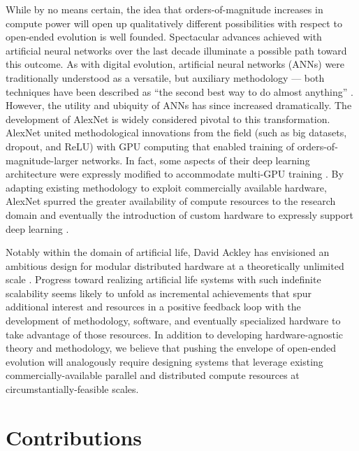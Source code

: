 While by no means certain, the idea that orders-of-magnitude increases in compute power will open up qualitatively different possibilities with respect to open-ended evolution is well founded.
Spectacular advances achieved with artificial neural networks over the last decade illuminate a possible path toward this outcome. As with digital evolution, artificial neural networks (ANNs) were traditionally understood as a versatile, but auxiliary methodology — both techniques have been described as ``the second best way to do almost anything'' \citep{miaoulis2008intelligent,eiben2015introduction}.
However, the utility and ubiquity of ANNs has since increased dramatically. The development of AlexNet is widely considered pivotal to this transformation. AlexNet united methodological innovations from the field (such as big datasets, dropout, and ReLU) with GPU computing that enabled training of orders-of-magnitude-larger networks.
In fact, some aspects of their deep learning architecture were expressly modified to accommodate multi-GPU training \citep{krizhevsky2012imagenet}.
By adapting existing methodology to exploit commercially available hardware, AlexNet spurred the greater availability of compute resources to the research domain and eventually the introduction of custom hardware to expressly support deep learning \citep{jouppi2017datacenter}.

Notably within the domain of artificial life, David Ackley has envisioned an ambitious design for modular distributed hardware at a theoretically unlimited scale \citep{ackley2011pursue}.
Progress toward realizing artificial life systems with such indefinite scalability seems likely to unfold as incremental achievements that spur additional interest and resources in a positive feedback loop with the development of methodology, software, and eventually specialized hardware to take advantage of those resources.
In addition to developing hardware-agnostic theory and methodology, we believe that pushing the envelope of open-ended evolution will analogously require designing systems that leverage existing commercially-available parallel and distributed compute resources at circumstantially-feasible scales.

\section{Contributions}

